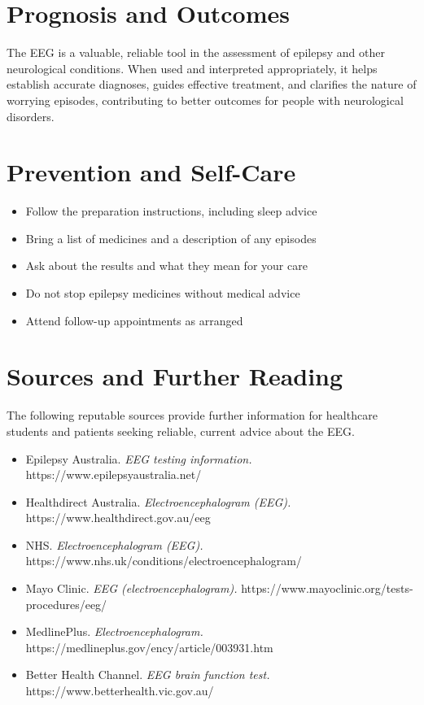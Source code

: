 \section*{Prognosis and Outcomes}
The EEG is a valuable, reliable tool in the assessment of epilepsy and other neurological conditions. When used and interpreted appropriately, it helps establish accurate diagnoses, guides effective treatment, and clarifies the nature of worrying episodes, contributing to better outcomes for people with neurological disorders.

\section*{Prevention and Self-Care}
\begin{itemize}
    \item Follow the preparation instructions, including sleep advice
    \item Bring a list of medicines and a description of any episodes
    \item Ask about the results and what they mean for your care
    \item Do not stop epilepsy medicines without medical advice
    \item Attend follow-up appointments as arranged
\end{itemize}

\section*{Sources and Further Reading}
The following reputable sources provide further information for healthcare students and patients seeking reliable, current advice about the EEG.
\begin{itemize}
    \item Epilepsy Australia. \textit{EEG testing information.} https://www.epilepsyaustralia.net/
    \item Healthdirect Australia. \textit{Electroencephalogram (EEG).} https://www.healthdirect.gov.au/eeg
    \item NHS. \textit{Electroencephalogram (EEG).} https://www.nhs.uk/conditions/electroencephalogram/
    \item Mayo Clinic. \textit{EEG (electroencephalogram).} https://www.mayoclinic.org/tests-procedures/eeg/
    \item MedlinePlus. \textit{Electroencephalogram.} https://medlineplus.gov/ency/article/003931.htm
    \item Better Health Channel. \textit{EEG brain function test.} https://www.betterhealth.vic.gov.au/
\end{itemize}
